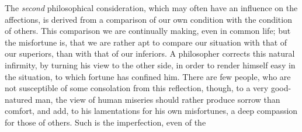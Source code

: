 The \textit{second} philosophical consideration, which may often have
an influence on the affections, is derived from a comparison of our
own condition with the condition of others. This comparison we are
continually making, even in common  life; but the misfortune
is, that we are rather apt to compare our situation with that of our
superiors, than with that of our inferiors. A philosopher corrects
this natural infirmity, by turning his view to the other side, in
order to render himself easy in the situation, to which fortune has
confined him. There are few people, who are not susceptible of some
consolation from this reflection, though, to a very good-natured man,
the view of human miseries should rather produce sorrow than comfort,
and add, to his lamentations for his own misfortunes, a deep
compassion for those of others. Such is the imperfection, even of the
